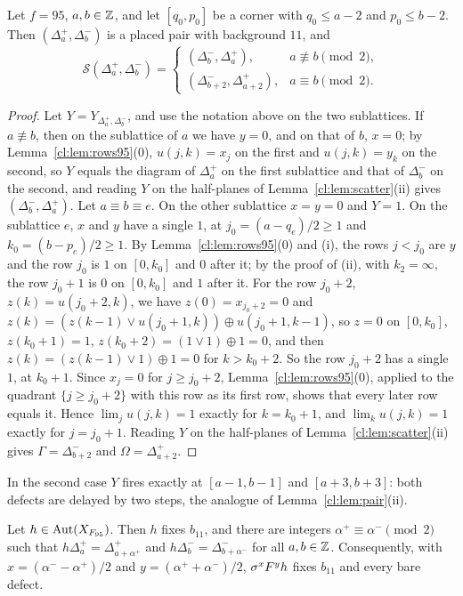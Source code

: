 \begin{lemma}\label{cl:lem:pair95}
Let $f=95$, $a,b\in\mathbb{Z}$, and let $[q_0,p_0]$ be a corner with $q_0\le a-2$ and $p_0\le b-2$. Then $(\Delta^+_a,\Delta^-_b)$ is a placed pair with background $11$, and
\[
\mathcal S(\Delta^+_a,\Delta^-_b)=\begin{cases}(\Delta^-_b,\Delta^+_a),&a\not\equiv b\pmod2,\\(\Delta^-_{b+2},\Delta^+_{a+2}),&a\equiv b\pmod2.\end{cases}
\]
\end{lemma}

\begin{proof}
Let $Y=Y_{\Delta^+_a,\Delta^-_b}$, and use the notation above on the two sublattices. If $a\not\equiv b$, then on the sublattice of $a$ we have $y=0$, and on that of $b$, $x=0$; by Lemma~\ref{cl:lem:rows95}(0), $u(j,k)=x_j$ on the first and $u(j,k)=y_k$ on the second, so $Y$ equals the diagram of $\Delta^+_a$ on the first sublattice and that of $\Delta^-_b$ on the second, and reading $Y$ on the half-planes of Lemma~\ref{cl:lem:scatter}(ii) gives $(\Delta^-_b,\Delta^+_a)$. Let $a\equiv b\equiv e$. On the other sublattice $x=y=0$ and $Y=1$. On the sublattice $e$, $x$ and $y$ have a single $1$, at $j_0=(a-q_e)/2\ge1$ and $k_0=(b-p_e)/2\ge1$. By Lemma~\ref{cl:lem:rows95}(0) and (i), the rows $j<j_0$ are $y$ and the row $j_0$ is $1$ on $[0,k_0]$ and $0$ after it; by the proof of (ii), with $k_2=\infty$, the row $j_0+1$ is $0$ on $[0,k_0]$ and $1$ after it. For the row $j_0+2$, $z(k)=u(j_0+2,k)$, we have $z(0)=x_{j_0+2}=0$ and $z(k)=(z(k-1)\vee u(j_0+1,k))\oplus u(j_0+1,k-1)$, so $z=0$ on $[0,k_0]$, $z(k_0+1)=1$, $z(k_0+2)=(1\vee1)\oplus1=0$, and then $z(k)=(z(k-1)\vee1)\oplus1=0$ for $k>k_0+2$. So the row $j_0+2$ has a single $1$, at $k_0+1$. Since $x_j=0$ for $j\ge j_0+2$, Lemma~\ref{cl:lem:rows95}(0), applied to the quadrant $\{j\ge j_0+2\}$ with this row as its first row, shows that every later row equals it. Hence $\lim_ju(j,k)=1$ exactly for $k=k_0+1$, and $\lim_ku(j,k)=1$ exactly for $j=j_0+1$. Reading $Y$ on the half-planes of Lemma~\ref{cl:lem:scatter}(ii) gives $\Gamma=\Delta^-_{b+2}$ and $\Omega=\Delta^+_{a+2}$.
\end{proof}

In the second case $Y$ fires exactly at $[a-1,b-1]$ and $[a+3,b+3]$: both defects are delayed by two steps, the analogue of Lemma~\ref{cl:lem:pair}(ii).

\begin{theorem}\label{cl:thm:KR95}
Let $h\in\operatorname{Aut}(X_{F_{95}})$. Then $h$ fixes $b_{11}$, and there are integers $\alpha^+\equiv\alpha^-\pmod2$ such that $h\Delta^+_a=\Delta^+_{a+\alpha^+}$ and $h\Delta^-_b=\Delta^-_{b+\alpha^-}$ for all $a,b\in\mathbb{Z}$. Consequently, with $x=(\alpha^--\alpha^+)/2$ and $y=(\alpha^++\alpha^-)/2$, $\sigma^xF^yh$ fixes $b_{11}$ and every bare defect.
\end{theorem}

